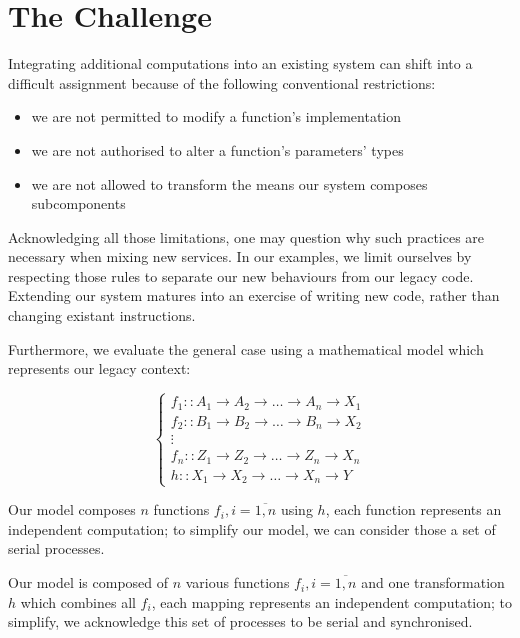 \section{The Challenge}
\label{sec::problem}

Integrating additional computations into an existing system can shift into a difficult assignment because of the following conventional restrictions:

\begin{itemize}
    \item we are not permitted to modify a function's implementation
    \item we are not authorised to alter a function's parameters' types
    \item we are not allowed to transform the means our system composes subcomponents
\end{itemize}

Acknowledging all those limitations, one may question why such practices are necessary when mixing new services. In our examples, we limit ourselves by respecting those rules to separate our new behaviours from our legacy code. Extending our system matures into an exercise of writing new code, rather than changing existant instructions. 

Furthermore, we evaluate the general case using a mathematical model which represents our legacy context:

\begin{equation}
\begin{cases}
f_1 :: A_1 \rightarrow A_2 \rightarrow \dots \rightarrow A_n \rightarrow X_1 \\
f_2 :: B_1 \rightarrow B_2 \rightarrow \dots \rightarrow B_n \rightarrow X_2 \\
\vdots \\
f_n :: Z_1 \rightarrow Z_2 \rightarrow \dots \rightarrow Z_n \rightarrow X_n \\
h :: X_1 \rightarrow X_2 \rightarrow \dots \rightarrow X_n \rightarrow Y
\end{cases}
\end{equation}

Our model composes $n$ functions $ f_i, i = \overline{1,n} $ using $ h $, each function represents an independent computation; to simplify our model, we can consider those a set of serial processes.

Our model is composed of $n$ various functions $ f_i, i = \overline{1,n} $ and one transformation $h$ which combines all $f_i$, each mapping represents an independent computation; to simplify, we acknowledge this set of processes to be serial and synchronised.

